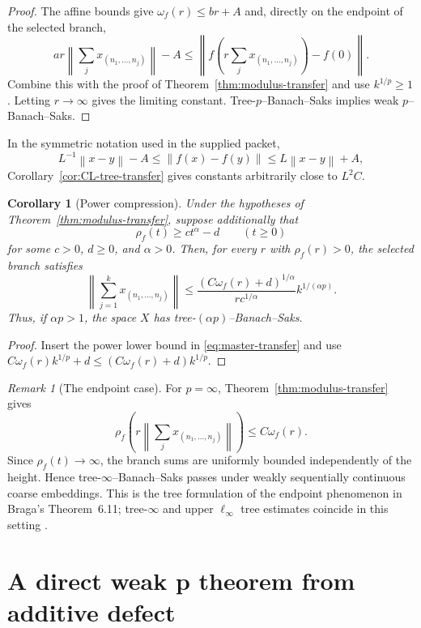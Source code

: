 \documentclass[11pt]{amsart}
\newtheorem{corollary}[theorem]{Corollary}
\theoremstyle{definition}
\theoremstyle{remark}
\newtheorem{remark}[theorem]{Remark}
\newcommand{\norm}[1]{\left\lVert #1\right\rVert}
\begin{document}
\begin{proof}
The affine bounds give $\omega_f(r)\le br+A$ and, directly on the endpoint of the selected branch,
\[
 ar\norm{\sum_jx_{(n_1,\ldots,n_j)}}-A
 \le \norm{f(r\sum_jx_{(n_1,\ldots,n_j)})-f(0)}.
\]
Combine this with the proof of Theorem~\ref{thm:modulus-transfer} and use $k^{1/p}\ge1$.  Letting $r\to\infty$ gives the limiting constant.  Tree-$p$--Banach--Saks implies weak $p$--Banach--Saks.
\end{proof}

In the symmetric notation used in the supplied packet,
\[
 L^{-1}\norm{x-y}-A\le\norm{f(x)-f(y)}\le L\norm{x-y}+A,
\]
Corollary~\ref{cor:CL-tree-transfer} gives constants arbitrarily close to $L^2C$.

\begin{corollary}[Power compression]\label{cor:power-compression}
Under the hypotheses of Theorem~\ref{thm:modulus-transfer}, suppose additionally that
\[
 \rho_f(t)\ge c t^\alpha-d\qquad(t\ge0)
\]
for some $c>0$, $d\ge0$, and $\alpha>0$.  Then, for every $r$ with $\rho_f(r)>0$, the selected branch satisfies
\[
 \norm{\sum_{j=1}^k x_{(n_1,\ldots,n_j)}}
 \le
 \frac{(C\omega_f(r)+d)^{1/\alpha}}{r c^{1/\alpha}}
 k^{1/(\alpha p)}.
\]
Thus, if $\alpha p>1$, the space $X$ has tree-$(\alpha p)$--Banach--Saks.
\end{corollary}

\begin{proof}
Insert the power lower bound in \eqref{eq:master-transfer} and use
$C\omega_f(r)k^{1/p}+d\le(C\omega_f(r)+d)k^{1/p}$.
\end{proof}

\begin{remark}[The endpoint case]
For $p=\infty$, Theorem~\ref{thm:modulus-transfer} gives
\[
 \rho_f\!\left(r\norm{\sum_jx_{(n_1,\ldots,n_j)}}\right)
 \le C\omega_f(r).
\]
Since $\rho_f(t)\to\infty$, the branch sums are uniformly bounded independently of the height.  Hence tree-$\infty$--Banach--Saks passes under weakly sequentially continuous coarse embeddings.  This is the tree formulation of the endpoint phenomenon in Braga's Theorem~6.11; tree-$\infty$ and upper $\ell_\infty$ tree estimates coincide in this setting \cite{BragaJIMJ,FovelleHamming}.
\end{remark}

\section{A direct weak p theorem from additive defect}
\end{document}
